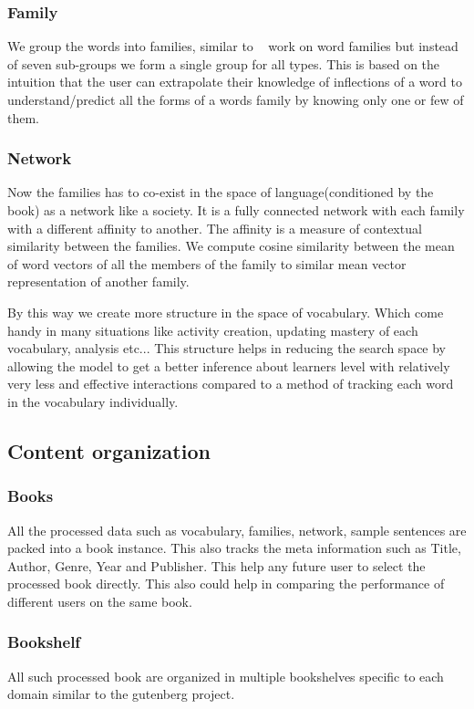 \documentclass[11pt,a4paper]{article}
\begin{document}
\subsubsection{Family}
We group the words into families, similar to ~\citep{bauer1993word} work on word
families but instead of seven sub-groups we form a single group for all types.
This is based on the intuition that the user can extrapolate their knowledge of
inflections of a word to understand/predict all the forms of a words family
by knowing only one or few of them.

\subsubsection{Network}
Now the families has to co-exist in the space of language(conditioned by the
book) as a network like a society. It is a fully connected network with each
family with a different affinity to another. The affinity is a measure of
contextual similarity between the families. We compute cosine similarity 
between the mean of word vectors of all the members of the family to similar
mean vector representation of another family.

By this way we create more structure in the space of vocabulary. Which come
handy in many situations like activity creation, updating mastery of each
vocabulary, analysis etc... This structure helps in reducing the search space
by allowing the model to get a better inference about learners level with
relatively very less and effective interactions compared to a method of
tracking each word in the vocabulary individually.

\subsection{Content organization}
\subsubsection{Books}
All the processed data such as vocabulary, families, network, sample sentences
are packed into a book instance. This also tracks the meta information such as
Title, Author, Genre, Year and Publisher. This help any future user to select
the processed book directly. This also could help in comparing the performance
of different users on the same book.

\subsubsection{Bookshelf}
All such processed book are organized in multiple bookshelves specific to each
domain similar to the gutenberg project.
\end{document}
